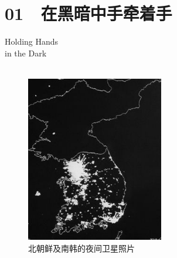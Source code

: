\fancyhead[RO]{{\tiny{\textcolor{Gray}{\FA \ }}}\thepage}
\fancyhead[LE]{{\tiny{\textcolor{Gray}{\FA \ }}}\thepage}
\fancyfoot[LE,RO]{}
\fancyfoot[LO,CE]{}
\fancyfoot[CO,RE]{}
\chapter*{01 {\FA } 在黑暗中手牵着手}
\vspace{5mm}
\begin{flushright}
	\textcolor{PinYinColor}{\EN \huge{Holding Hands\\
		in the Dark\\
	\ \\}}
\end{flushright}
\begin{figure}[!htbp]
	\centering
	\includegraphics[width=6cm]{./Chapters/Images/01.jpg}
	\caption*{北朝鲜及南韩的夜间卫星照片}
\end{figure}


